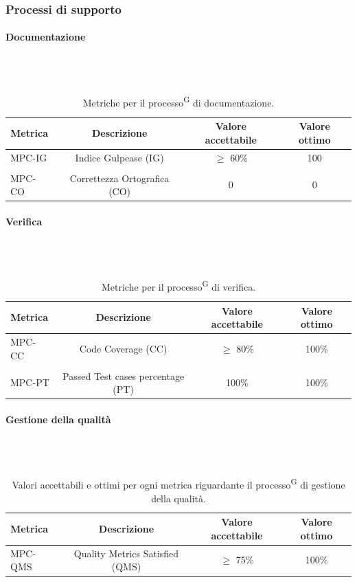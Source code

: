 \documentclass[8pt]{article}
\newcommand{\glossterm}[1]{#1\textsuperscript{G}} %
\newcommand{\subsubsubsection}[1]{\paragraph{#1}\mbox{}\\\\}
\begin{document}
\subsubsection{Processi di supporto}
\subsubsubsection{Documentazione}
\begin{table}[h]	
	\centering
	\begin{tabular}{lccc}
		\toprule
		\textbf{Metrica}& \textbf{Descrizione} & \textbf{Valore accettabile} & \textbf{Valore ottimo} \\
		\midrule
		MPC-IG & Indice Gulpease (IG) & $\geq$ 60\% & 100 \\\\
		MPC-CO & Correttezza Ortografica (CO) & 0 & 0 \\
		\bottomrule
	\end{tabular}
	\caption{Metriche per il \glossterm{processo} di documentazione.}
	\label{table:Tabella delle metriche per il processo di documentazione}
\end{table}
\subsubsubsection{Verifica}
\begin{table}[h]	
	\centering
	\begin{tabular}{lccc}
		\toprule
		\textbf{Metrica}& \textbf{Descrizione} & \textbf{Valore accettabile} & \textbf{Valore ottimo} \\
		\midrule
		MPC-CC & Code Coverage (CC) & $\geq$ 80\% & 100\% \\\\
		MPC-PT & Passed Test cases percentage (PT) & 100\% & 100\% \\
		\bottomrule
	\end{tabular}
	\caption{Metriche per il \glossterm{processo} di verifica.}
	\label{table:Tabella delle metriche per il processo di verifica}
\end{table}
\subsubsubsection{Gestione della qualità}
\begin{table}[H]	
	\centering
	\begin{tabular}{lccc}
		\toprule
		\textbf{Metrica}& \textbf{Descrizione} & \textbf{Valore accettabile} & \textbf{Valore ottimo} \\
		\midrule
		MPC-QMS & Quality Metrics Satisfied (QMS) & $\geq$ 75\%& 100\%\\
		\bottomrule
	\end{tabular}
	\caption{Valori accettabili e ottimi per ogni metrica riguardante il \glossterm{processo} di gestione della qualità.}
	\label{table:Valori accettabili e ottimi per ogni metrica riguardante il processo di gestione della qualità.}
\end{table}
\clearpage
\end{document}
